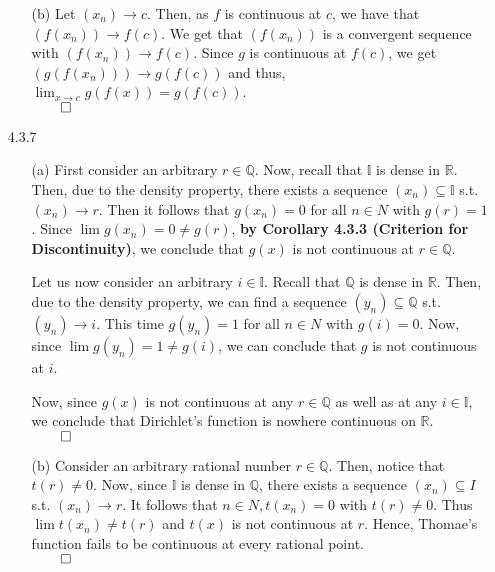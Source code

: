 \documentclass[11pt]{article}
\newcommand{\reals}{\mathbb{R}}
\newcommand{\rats}{\mathbb{Q}}
\newcommand{\irrats}{\mathbb{I}}
\begin{document}
\begin{itemize}
\begin{itemize}
            \item[(b)]
                Let $(x_n) \to c$. Then, as $f$ is continuous at $c$, we have
                that $(f(x_n)) \to f(c)$. We get that $(f(x_n))$ is a
                convergent sequence with $(f(x_n)) \to f(c)$. Since $g$ is
                continuous at $f(c)$, we get $(g(f(x_n))) \to g(f(c))$ and
                thus, $\lim_{x \to c} g(f(x)) = g(f(c))$.\\
                $\qed$
        \end{itemize} 

    \item[4.3.7]
        \begin{itemize}
            \item[(a)]
                First consider an arbitrary $r \in \rats$. Now, recall that
                $\irrats$ is dense in $\reals$. Then, due to the density
                property, there exists a sequence $(x_n) \subseteq \irrats$
                s.t. $(x_n) \to r$. Then it follows that $g(x_n) = 0$ for all
                $n \in N$ with $g(r) = 1$. Since $\lim g(x_n) = 0 \neq g(r)$,
                \textbf{by Corollary 4.3.3 (Criterion for Discontinuity)}, we
                conclude that $g(x)$ is not continuous at $r \in \rats$.

                Let us now consider an arbitrary $i \in \irrats$. Recall that
                $\rats$ is dense in $\reals$. Then, due to the density
                property, we can find a sequence $(y_n) \subseteq \rats$ s.t.
                $(y_n) \to i$. This time $g(y_n) = 1$ for all $n \in N$
                with $g(i) = 0$. Now, since $\lim g(y_n) = 1 \neq g(i)$, we can
                conclude that $g$ is not continuous at $i$.

                Now, since $g(x)$ is not continuous at any $r \in \rats$ as
                well as at any $i \in \irrats$, we conclude that Dirichlet's
                function is nowhere continuous on $\reals$.\\
                $\qed$

            \item[(b)]
                Consider an arbitrary rational number $r \in \rats$. Then,
                notice that $t(r) \neq 0$. Now, since $\irrats$ is dense in
                $\rats$, there exists a sequence $(x_n) \subseteq I$ s.t.
                $(x_n) \to r$.  It follows that $n \in N, t(x_n) = 0$ with
                $t(r) \neq 0$.  Thus $\lim t(x_n) \neq t(r)$ and $t(x)$ is not
                continuous at $r$.  Hence, Thomae's function fails to be
                continuous at every rational point.\\
                $\qed$


\end{itemize}
\end{itemize}
\end{document}
